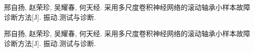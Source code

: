 \begin{appendixA}
	\begin{enumerate}[label={[\arabic*]}]
		\item 邢自扬, 赵荣珍, 吴耀春, 何天经. 采用多尺度卷积神经网络的滚动轴承小样本故障诊断方法[J]. 振动.测试与诊断.
		\item 邢自扬, 赵荣珍, 吴耀春, 何天经. 采用多尺度卷积神经网络的滚动轴承小样本故障诊断方法[J]. 振动.测试与诊断.
	\end{enumerate}
\end{appendixA}

